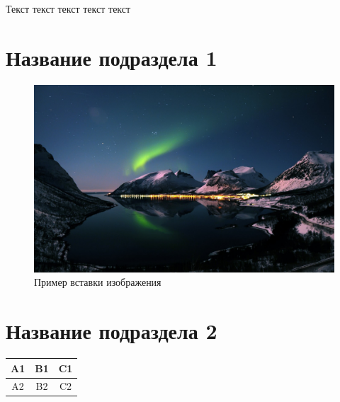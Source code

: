 Текст текст текст текст текст\\

\section{Название подраздела 1}

\begin{figure}[H]
	\begin{center}
		\includegraphics[width=0.7\linewidth]{src/img/img_example.png}
		\caption{Пример вставки изображения}
		\label{fig:img_example}
	\end{center}
\end{figure}

\section{Название подраздела 2}

\begin{center}
		\begin{tabular}{|c|c|c|}
			\hline
			A1 & B1 & C1 \\ \hline
			A2 & B2 & C2 \\ \hline
		\end{tabular}
\end{center}
\label{tab:tab_example}

